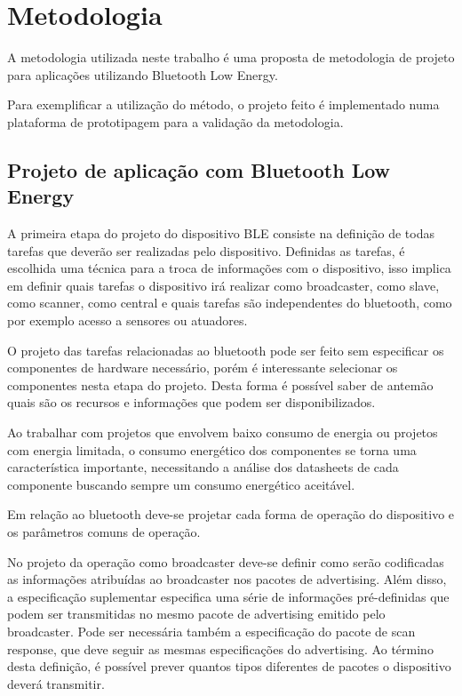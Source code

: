 \section{Metodologia}

A metodologia utilizada neste trabalho é uma proposta de metodologia de projeto
para aplicações utilizando Bluetooth Low Energy. 

Para exemplificar a utilização do método, o projeto feito é implementado numa
plataforma de prototipagem para a validação da metodologia.

\subsection{Projeto de aplicação com Bluetooth Low Energy}

A primeira etapa do projeto do dispositivo BLE consiste na definição de todas
tarefas que deverão ser realizadas pelo dispositivo. Definidas as tarefas, é
escolhida uma técnica para a troca de informações com o dispositivo, isso
implica em definir quais tarefas o dispositivo irá realizar como broadcaster,
como slave, como scanner, como central e quais tarefas são independentes do
bluetooth, como por exemplo acesso a sensores ou atuadores.

O projeto das tarefas relacionadas ao bluetooth pode ser feito sem especificar
os componentes de hardware necessário, porém é interessante selecionar os
componentes nesta etapa do projeto. Desta forma é possível saber de antemão
quais são os recursos e informações que podem ser disponibilizados.

Ao trabalhar com projetos que envolvem baixo consumo de energia ou projetos com
energia limitada, o consumo energético dos componentes se torna uma
característica importante, necessitando a análise dos datasheets de cada
componente buscando sempre um consumo energético aceitável.

Em relação ao bluetooth deve-se projetar cada forma de operação do dispositivo e
os parâmetros comuns de operação.

No projeto da operação como broadcaster deve-se definir como serão codificadas
as informações atribuídas ao broadcaster nos pacotes de advertising. Além
disso, a especificação suplementar especifica uma série de informações
pré-definidas que podem ser transmitidas no mesmo pacote de advertising emitido
pelo broadcaster\cite{ble4sup}. Pode ser necessária também a especificação do
pacote de scan response, que deve seguir as mesmas especificações do
advertising. Ao término desta definição, é possível prever quantos tipos
diferentes de pacotes o dispositivo deverá transmitir.

